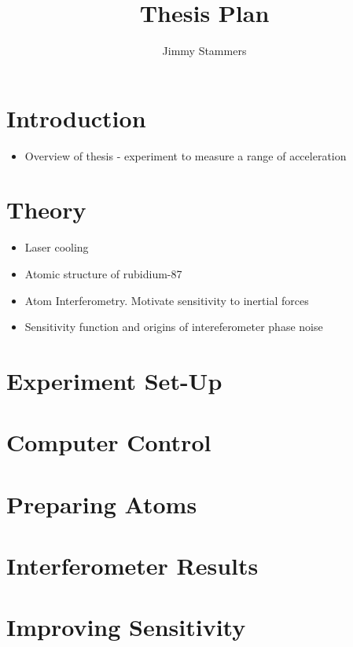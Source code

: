 \documentclass{article}
\title{Thesis Plan}
\author{Jimmy Stammers}
\begin{document}
    \maketitle
\section{Introduction}
    \begin{itemize}
        \item Overview of thesis - experiment to measure a range of acceleration
    \end{itemize}
\section{Theory}
    \begin{itemize}
        \item Laser cooling
        \item Atomic structure of rubidium-87
        \item Atom Interferometry. Motivate sensitivity to inertial forces
        \item Sensitivity function and origins of intereferometer phase noise
    \end{itemize}
\section{Experiment Set-Up}
    \begin{itemize}
        
    \end{itemize}
\section{Computer Control}
\section{Preparing Atoms}
\section{Interferometer Results}
\section{Improving Sensitivity}
\end{document}
